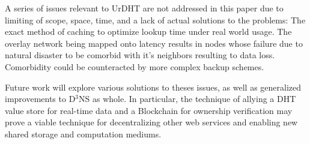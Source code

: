 A series of issues relevant to UrDHT are not addressed in this paper due to limiting of scope, space, time, and a lack of actual solutions to the problems: The exact method of caching to optimize lookup time under real world usage. The overlay network being mapped onto latency results in nodes whose failure due to natural disaster to be comorbid with it's neighbors resulting to data loss. Comorbidity could be counteracted by more complex backup schemes.

Future work will explore various solutions to theses issues, as well as generalized improvements to D$^3$NS as whole.  In particular, the technique of allying a DHT value store for real-time data and a Blockchain for ownership verification may prove a viable technique for decentralizing other web services and enabling new shared storage and computation mediums.
